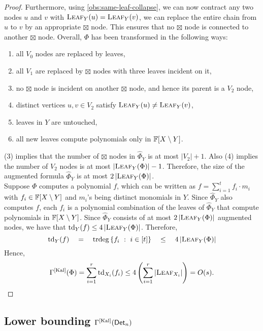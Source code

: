 \begin{proof}
Furthermore, using \autoref{obs:same-leaf-collapse}, we can now contract any two nodes $u$ and $v$ with $\textsc{Leaf}_Y(u) = \textsc{Leaf}_Y(v)$, we can replace the entire chain from $u$ to $v$ by an appropriate $\boxtimes$ node. 
This ensures that no $\boxtimes$ node is connected to another $\boxtimes$ node. 
Overall, $\Phi$ has been transformed in the following ways:
\begin{enumerate}
\itemsep 0pt
\item all $V_0$ nodes are replaced by leaves,
\item all $V_1$ are replaced by $\boxtimes$ nodes with three leaves incident on it,
\item no $\boxtimes$ node is incident on another $\boxtimes$ node, and hence its parent is a $V_2$ node,
\item distinct vertices $u,v\in V_2$ satisfy $\textsc{Leaf}_Y(u) \neq \textsc{Leaf}_Y(v)$, 
\item leaves in $Y$ are untouched,
\item all new leaves compute polynomials only in $\mathbb{F}[X \setminus Y]$.
\end{enumerate}
(3) implies that the number of $\boxtimes$ nodes in $\hat{\Phi}_Y$ is at most $|V_2| + 1$.
Also (4) implies the number of $V_2$ nodes is at most $\left|\textsc{Leaf}_Y(\Phi)\right| - 1$.
Therefore, the size of the augmented formula $\hat{\Phi}_Y$ is at most $2\left|\textsc{Leaf}_Y(\Phi)\right|$.
\\

Suppose $\Phi$ computes a polynomial $f$, which can be written as $f = \sum_{i=1}^t f_i\cdot m_i$ with $f_i \in \mathbb{F}[X\setminus Y]$ and $m_i$'s being distinct monomials in $Y$.
Since $\hat{\Phi}_Y$ also computes $f$, each $f_i$ is a polynomial combination of the leaves of $\hat{\Phi}_Y$ that compute polynomials in $\mathbb{F}[X \setminus Y]$.
Since $\hat{\Phi}_Y$ consists of at most $2\left|\textsc{Leaf}_Y(\Phi)\right|$ augmented nodes, we have that $\mathrm{td}_Y(f) \leq 4\left|\textsc{Leaf}_Y(\Phi)\right|$.
Therefore,
$$
\mathrm{td}_Y(f) \quad=\quad \mathrm{trdeg}\left\{{f_i}\ : \ {i\in [t]}\right\} \quad\leq\quad 4\left|\textsc{Leaf}_Y(\Phi)\right|
$$
Hence, 
$$
\Gamma^{\mathrm{[Kal]}}(\Phi) = \sum_{i=1}^r \mathrm{td}_{X_i}(f_i) \leq 4\left(\sum_{i=1}^r \left|\textsc{Leaf}_{X_i}\right|\right) = O(s).\qedhere
$$
\end{proof}

\subsection{Lower bounding $\Gamma^{\mathrm{[Kal]}}(\operatorname{\mathsf{Det}}_n)$}


